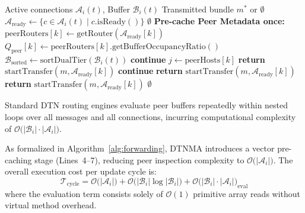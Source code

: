 \documentclass[journal,compsoc]{IEEEtran}
\begin{document}
\begin{algorithm}[t]
\caption{Pre-Cached Policy-Governed Forwarding}
\label{alg:forwarding}
\begin{algorithmic}[1]
\Require Active connections $\mathcal{A}_i(t)$, Buffer $\mathcal{B}_i(t)$
\Ensure Transmitted bundle $m^*$ or $\emptyset$
\State $\mathcal{A}_{\mathrm{ready}} \gets \{c \in \mathcal{A}_i(t) \mid c.\mathrm{isReady}()\}$
 \Return $\emptyset$ \EndIf
\State \textbf{Pre-cache Peer Metadata once:}
    \State $\mathrm{peerRouters}[k] \gets \mathrm{getRouter}(\mathcal{A}_{\mathrm{ready}}[k])$
    \State $Q_{\mathrm{peer}}[k] \gets \mathrm{peerRouters}[k].\mathrm{getBufferOccupancyRatio}()$
\EndFor
\State $\mathcal{B}_{\mathrm{sorted}} \gets \mathrm{sortDualTier}(\mathcal{B}_i(t))$ 
     \textbf{continue} \EndIf
        \State $j \gets \mathrm{peerHosts}[k]$
         
            \State \textbf{return} $\mathrm{startTransfer}(m, \mathcal{A}_{\mathrm{ready}}[k])$
        \EndIf
         
             \textbf{continue} \EndIf
            \State \textbf{return} $\mathrm{startTransfer}(m, \mathcal{A}_{\mathrm{ready}}[k])$
        \Else {}
                \State \textbf{return} $\mathrm{startTransfer}(m, \mathcal{A}_{\mathrm{ready}}[k])$
            \EndIf
        \EndIf
    \EndFor
\EndFor
\State \Return $\emptyset$
\end{algorithmic}
\end{algorithm}

Standard DTN routing engines evaluate peer buffers repeatedly within nested loops over all messages and all connections, incurring computational complexity of $\mathcal{O}\bigl(|\mathcal{B}_i| \cdot |\mathcal{A}_i|\bigr)$. 

As formalized in Algorithm~\ref{alg:forwarding}, DTNMA introduces a vector pre-caching stage (Lines~4--7), reducing peer inspection complexity to $\mathcal{O}\bigl(|\mathcal{A}_i|\bigr)$. The overall execution cost per update cycle is:
\begin{equation}
\mathcal{T}_{\mathrm{cycle}} = \mathcal{O}\bigl(|\mathcal{A}_i|\bigr) + \mathcal{O}\bigl(|\mathcal{B}_i| \log |\mathcal{B}_i|\bigr) + \mathcal{O}\bigl(|\mathcal{B}_i| \cdot |\mathcal{A}_i|\bigr)_{\mathrm{eval}}
\end{equation}
where the evaluation term consists solely of $\mathcal{O}(1)$ primitive array reads without virtual method overhead.
\end{document}
